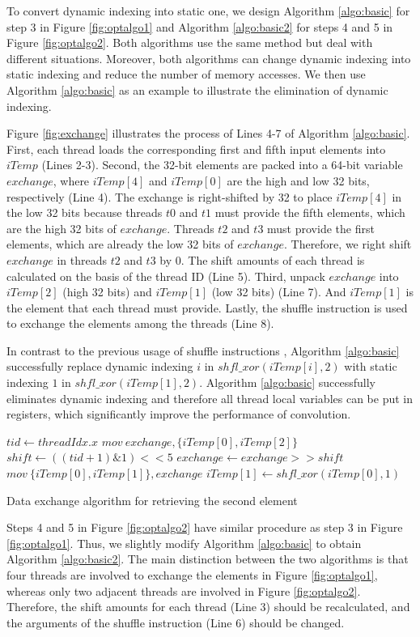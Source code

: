 To convert dynamic indexing into static one, we design Algorithm \ref{algo:basic} for step 3 in Figure \ref{fig:optalgo1} and
Algorithm \ref{algo:basic2} for steps 4 and 5 in Figure \ref{fig:optalgo2}. Both algorithms use the same method but deal with different
situations. Moreover, both algorithms can change dynamic indexing into static indexing and reduce the number of memory accesses. We then use Algorithm
\ref{algo:basic} as an example to illustrate the elimination of dynamic indexing.

Figure \ref{fig:exchange} illustrates the process of Lines 4-7 of Algorithm \ref{algo:basic}. First, each thread loads the corresponding first and fifth input elements into $iTemp$ (Lines 2-3). Second, the 32-bit elements are packed into a 64-bit variable $exchange$, where $iTemp[4]$ and $iTemp[0]$ are the high and low 32 bits, respectively (Line 4). The exchange is right-shifted by 32 to place $iTemp[4]$ in the low 32 bits because threads $t0$ and $t1$ must provide the fifth
elements, which are the high 32 bits of $exchange$. Threads $t2$ and $t3$ must provide the first elements, which are already the low 32 bits of $exchange$. Therefore, we right shift $exchange$ in threads $t2$ and $t3$ by 0. The shift amounts of each thread is calculated on the basis of the thread ID (Line 5). Third, unpack $exchange$ into $iTemp[2]$
(high 32 bits) and $iTemp[1]$ (low 32 bits) (Line 7). And $iTemp[1]$ is the element that each thread must provide. Lastly, the
shuffle instruction is used to exchange the elements among the threads (Line 8).

In contrast to the previous usage of shuffle instructions \cite{vasilache2014fast}, Algorithm \ref{algo:basic} successfully replace dynamic
indexing $i$ in $shfl\_xor(iTemp[i],2)$ with static indexing $1$ in $shfl\_xor(iTemp[1],2)$. Algorithm \ref{algo:basic} successfully
eliminates dynamic indexing and therefore all thread local variables can be put in registers, which significantly improve the performance
of convolution.

\begin{algorithm}
	$tid \gets threadIdx.x$\;
	$mov\ exchange, \{iTemp[0], iTemp[2]\}$\;
	$shift \gets ((tid+1)\&1)<<5$\;
	$exchange \gets exchange >> shift$\;
	$mov\ \{iTemp[0],iTemp[1]\}, exchange$\;
	$iTemp[1] \gets shfl\_xor(iTemp[0],1)$\;	
	\caption{Data exchange algorithm for retrieving the second element}
	\label{algo:basic2}
\end{algorithm}

Steps 4 and 5 in Figure \ref{fig:optalgo2} have similar procedure as step 3 in Figure \ref{fig:optalgo1}. Thus, we slightly modify
Algorithm \ref{algo:basic} to obtain Algorithm \ref{algo:basic2}. The main distinction between the two algorithms is that four threads are involved to exchange the 
elements in Figure \ref{fig:optalgo1}, whereas only two adjacent threads are involved in Figure \ref{fig:optalgo2}. Therefore, the shift amounts for each thread (Line 3) should be recalculated, and the arguments of the shuffle instruction (Line 6) should be changed.

